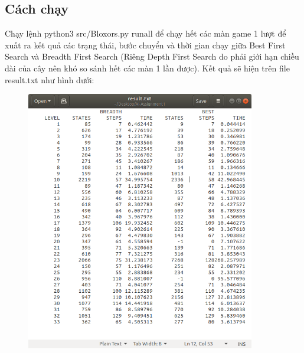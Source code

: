 \documentclass[a4paper]{article}
\begin{document}
\subsection{Cách chạy}
\begin{description}
	\item \hspace{1 cm}	Chạy lệnh python3 src/Bloxors.py runall để chạy hết các màn game 1 lượt để xuất ra kết quả các trạng thái, bước chuyển và thời gian chạy giữa Best First Search và Breadth First Search (Riêng Depth First Search do phải giới hạn chiều dài của cây nên khó so sánh hết các màn 1 lần được). Kết quả sẽ hiện trên file result.txt như hình dưới:
\end{description}
\begin{center}
	\begin{figure}[htp]
		\begin{center}
			\includegraphics[width=10cm]{Images/ssBFS_va_BRFS.png}
		\end{center}
		\caption{\label{fig:ssBFS_va_BRFS}}
	\end{figure}
\end{center}
\end{document}
